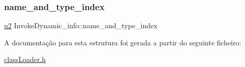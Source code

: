 \subsubsection{\texorpdfstring{name\+\_\+and\+\_\+type\+\_\+index}{name\_and\_type\_index}}
{\footnotesize\ttfamily \hyperlink{util_8h_a55ef8d87fd202b8417704c089899c5b9}{u2} Invoke\+Dynamic\+\_\+info\+::name\+\_\+and\+\_\+type\+\_\+index}



A documentação para esta estrutura foi gerada a partir do seguinte ficheiro\+:\begin{DoxyCompactItemize}
\item 
\hyperlink{class_loader_8h}{class\+Loader.\+h}\end{DoxyCompactItemize}
